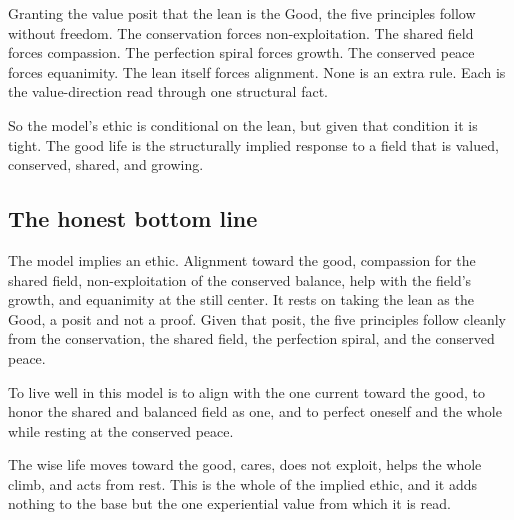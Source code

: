 \begin{theorem}
Granting the value posit that the lean is the Good, the five principles follow without freedom. The conservation forces non-exploitation. The shared field forces compassion. The perfection spiral forces growth. The conserved peace forces equanimity. The lean itself forces alignment. None is an extra rule. Each is the value-direction read through one structural fact.
\end{theorem}

So the model's ethic is conditional on the lean, but given that condition it is tight. The good life is the structurally implied response to a field that is valued, conserved, shared, and growing.

\subsection{The honest bottom line}

The model implies an ethic. Alignment toward the good, compassion for the shared field, non-exploitation of the conserved balance, help with the field's growth, and equanimity at the still center. It rests on taking the lean as the Good, a posit and not a proof. Given that posit, the five principles follow cleanly from the conservation, the shared field, the perfection spiral, and the conserved peace.

\begin{principle}
To live well in this model is to align with the one current toward the good, to honor the shared and balanced field as one, and to perfect oneself and the whole while resting at the conserved peace.
\end{principle}

The wise life moves toward the good, cares, does not exploit, helps the whole climb, and acts from rest. This is the whole of the implied ethic, and it adds nothing to the base but the one experiential value from which it is read.
